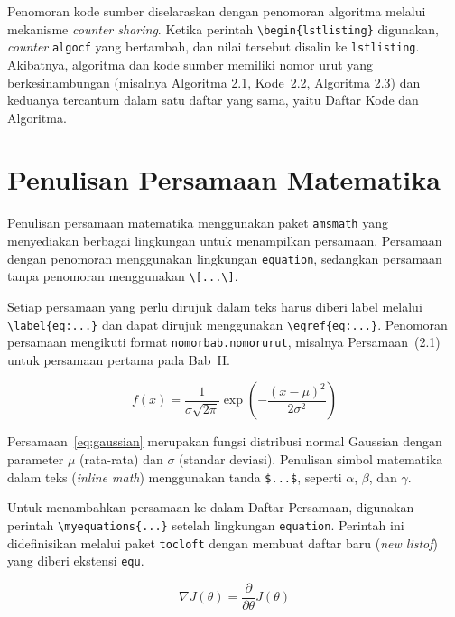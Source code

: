 Penomoran kode sumber diselaraskan dengan penomoran algoritma melalui mekanisme \textit{counter sharing}. Ketika perintah \texttt{\textbackslash begin\{lstlisting\}} digunakan, \textit{counter} \texttt{algocf} yang bertambah, dan nilai tersebut disalin ke \texttt{lstlisting}. Akibatnya, algoritma dan kode sumber memiliki nomor urut yang berkesinambungan (misalnya Algoritma 2.1, Kode~2.2, Algoritma 2.3) dan keduanya tercantum dalam satu daftar yang sama, yaitu Daftar Kode dan Algoritma.

\section{Penulisan Persamaan Matematika}

Penulisan persamaan matematika menggunakan paket \texttt{amsmath} yang menyediakan berbagai lingkungan untuk menampilkan persamaan. Persamaan dengan penomoran menggunakan lingkungan \texttt{equation}, sedangkan persamaan tanpa penomoran menggunakan \texttt{\textbackslash[...\textbackslash]}.

Setiap persamaan yang perlu dirujuk dalam teks harus diberi label melalui \texttt{\textbackslash label\{eq:...\}} dan dapat dirujuk menggunakan \texttt{\textbackslash eqref\{eq:...\}}. Penomoran persamaan mengikuti format \texttt{nomorbab.nomorurut}, misalnya Persamaan~(2.1) untuk persamaan pertama pada Bab~II.

\begin{equation}
  f(x) = \frac{1}{\sigma\sqrt{2\pi}} \exp\left(-\frac{(x-\mu)^2}{2\sigma^2}\right)
  \label{eq:gaussian}
\end{equation}

Persamaan~\eqref{eq:gaussian} merupakan fungsi distribusi normal Gaussian dengan parameter $\mu$ (rata-rata) dan $\sigma$ (standar deviasi). Penulisan simbol matematika dalam teks (\textit{inline math}) menggunakan tanda \texttt{\$...\$}, seperti $\alpha$, $\beta$, dan $\gamma$.

Untuk menambahkan persamaan ke dalam Daftar Persamaan, digunakan perintah \texttt{\textbackslash myequations\{...\}} setelah lingkungan \texttt{equation}. Perintah ini didefinisikan melalui paket \texttt{tocloft} dengan membuat daftar baru (\textit{new listof}) yang diberi ekstensi \texttt{equ}.

\begin{equation}
  \nabla J(\theta) = \frac{\partial}{\partial\theta} J(\theta)
\end{equation}

